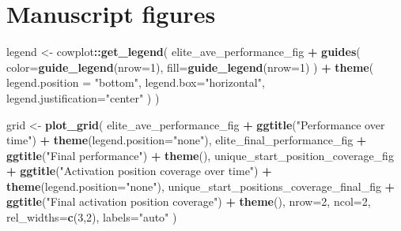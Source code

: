 \documentclass[]{book}
\newenvironment{Shaded}{\begin{snugshade}}{\end{snugshade}}
\newcommand{\DataTypeTok}[1]{\textcolor[rgb]{0.13,0.29,0.53}{#1}}
\newcommand{\DecValTok}[1]{\textcolor[rgb]{0.00,0.00,0.81}{#1}}
\newcommand{\KeywordTok}[1]{\textcolor[rgb]{0.13,0.29,0.53}{\textbf{#1}}}
\newcommand{\NormalTok}[1]{#1}
\newcommand{\OperatorTok}[1]{\textcolor[rgb]{0.81,0.36,0.00}{\textbf{#1}}}
\newcommand{\StringTok}[1]{\textcolor[rgb]{0.31,0.60,0.02}{#1}}
\begin{document}
\hypertarget{manuscript-figures-7}{%
\section{Manuscript figures}\label{manuscript-figures-7}}

\begin{Shaded}
\begin{Highlighting}[]
\NormalTok{legend <-}\StringTok{ }\NormalTok{cowplot}\OperatorTok{::}\KeywordTok{get_legend}\NormalTok{(}
\NormalTok{    elite_ave_performance_fig }\OperatorTok{+}
\StringTok{      }\KeywordTok{guides}\NormalTok{(}
        \DataTypeTok{color=}\KeywordTok{guide_legend}\NormalTok{(}\DataTypeTok{nrow=}\DecValTok{1}\NormalTok{),}
        \DataTypeTok{fill=}\KeywordTok{guide_legend}\NormalTok{(}\DataTypeTok{nrow=}\DecValTok{1}\NormalTok{)}
\NormalTok{      ) }\OperatorTok{+}
\StringTok{      }\KeywordTok{theme}\NormalTok{(}
        \DataTypeTok{legend.position =} \StringTok{"bottom"}\NormalTok{,}
        \DataTypeTok{legend.box=}\StringTok{"horizontal"}\NormalTok{,}
        \DataTypeTok{legend.justification=}\StringTok{"center"}
\NormalTok{      )}
\NormalTok{  )}

\NormalTok{grid <-}\StringTok{ }\KeywordTok{plot_grid}\NormalTok{(}
\NormalTok{  elite_ave_performance_fig }\OperatorTok{+}
\StringTok{    }\KeywordTok{ggtitle}\NormalTok{(}\StringTok{"Performance over time"}\NormalTok{) }\OperatorTok{+}
\StringTok{    }\KeywordTok{theme}\NormalTok{(}\DataTypeTok{legend.position=}\StringTok{"none"}\NormalTok{),}
\NormalTok{  elite_final_performance_fig }\OperatorTok{+}
\StringTok{    }\KeywordTok{ggtitle}\NormalTok{(}\StringTok{"Final performance"}\NormalTok{) }\OperatorTok{+}
\StringTok{    }\KeywordTok{theme}\NormalTok{(),}
\NormalTok{  unique_start_position_coverage_fig }\OperatorTok{+}
\StringTok{    }\KeywordTok{ggtitle}\NormalTok{(}\StringTok{"Activation position coverage over time"}\NormalTok{) }\OperatorTok{+}
\StringTok{    }\KeywordTok{theme}\NormalTok{(}\DataTypeTok{legend.position=}\StringTok{"none"}\NormalTok{),}
\NormalTok{  unique_start_positions_coverage_final_fig }\OperatorTok{+}
\StringTok{    }\KeywordTok{ggtitle}\NormalTok{(}\StringTok{"Final activation position coverage"}\NormalTok{) }\OperatorTok{+}
\StringTok{    }\KeywordTok{theme}\NormalTok{(),}
  \DataTypeTok{nrow=}\DecValTok{2}\NormalTok{,}
  \DataTypeTok{ncol=}\DecValTok{2}\NormalTok{,}
  \DataTypeTok{rel_widths=}\KeywordTok{c}\NormalTok{(}\DecValTok{3}\NormalTok{,}\DecValTok{2}\NormalTok{),}
  \DataTypeTok{labels=}\StringTok{"auto"}
\NormalTok{)}


\end{Highlighting}
\end{Shaded}
\end{document}
